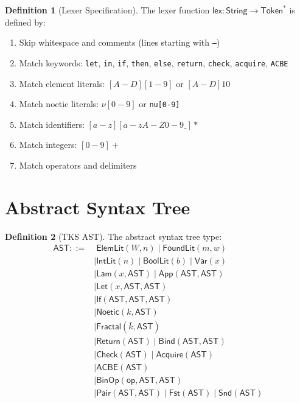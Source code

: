 \documentclass[11pt,twoside,openright]{book}
\theoremstyle{definition}
\newtheorem{definition}{Definition}[chapter]
\theoremstyle{plain}
\theoremstyle{remark}
\newcommand{\AST}{\mathsf{AST}}              %
\begin{document}
\begin{definition}[Lexer Specification]
\label{def:lexer-spec}
The lexer function $\mathsf{lex} : \mathsf{String} \to \mathsf{Token}^*$ is defined by:
\begin{enumerate}
  \item Skip whitespace and comments (lines starting with \texttt{--})
  \item Match keywords: \texttt{let}, \texttt{in}, \texttt{if}, \texttt{then}, \texttt{else}, \texttt{return}, \texttt{check}, \texttt{acquire}, \texttt{ACBE}
  \item Match element literals: $[A-D][1-9]$ or $[A-D]10$
  \item Match noetic literals: $\nu[0-9]$ or \texttt{nu[0-9]}
  \item Match identifiers: $[a-z][a-zA-Z0-9\_]*$
  \item Match integers: $[0-9]+$
  \item Match operators and delimiters
\end{enumerate}
\end{definition}

\section{Abstract Syntax Tree}

\begin{definition}[TKS AST]
\label{def:tks-ast}
The abstract syntax tree type:
\begin{align}
\AST ::=&\; \mathsf{ElemLit}(W, n) \mid \mathsf{FoundLit}(m, w) \\
    &\mid \mathsf{IntLit}(n) \mid \mathsf{BoolLit}(b) \mid \mathsf{Var}(x) \\
    &\mid \mathsf{Lam}(x, \AST) \mid \mathsf{App}(\AST, \AST) \\
    &\mid \mathsf{Let}(x, \AST, \AST) \\
    &\mid \mathsf{If}(\AST, \AST, \AST) \\
    &\mid \mathsf{Noetic}(k, \AST) \\
    &\mid \mathsf{Fractal}(\bar{k}, \AST) \\
    &\mid \mathsf{Return}(\AST) \mid \mathsf{Bind}(\AST, \AST) \\
    &\mid \mathsf{Check}(\AST) \mid \mathsf{Acquire}(\AST) \\
    &\mid \mathsf{ACBE}(\AST) \\
    &\mid \mathsf{BinOp}(\mathsf{op}, \AST, \AST) \\
    &\mid \mathsf{Pair}(\AST, \AST) \mid \mathsf{Fst}(\AST) \mid \mathsf{Snd}(\AST)
\end{align}
\end{definition}
\end{document}
